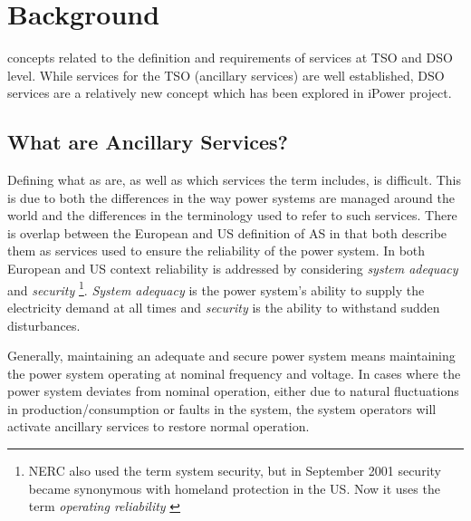 
\section{Background}\label{sec:backgroundservicesandreq} %
 concepts related to the definition and requirements of services at TSO and DSO level. While services for the TSO (ancillary services) are well established, DSO services are a relatively new concept which has been explored in iPower project.
\subsection{What are Ancillary Services?} %
\label{sub:ancillaryservicesdef}
Defining what \gls{as} are, as well as which services the term includes, is difficult. This is due to both the differences in the way power systems are managed around the world and the differences in the terminology used to refer to such services. There is overlap between the European and US definition of AS in that both describe them as services used to ensure the reliability of the power system. In both European and US context reliability is addressed by considering \emph{system adequacy} and \emph{security} \footnote{NERC also used the term system security, but in September 2001 security became synonymous with homeland protection in the US. Now it uses the term \emph{operating reliability} \cite{nerc2007definition}}. \emph{System adequacy} is the power system's ability to supply the electricity demand at all times and \emph{security} is the ability to withstand sudden disturbances.

Generally, maintaining an adequate and secure power system means maintaining the power system operating at nominal frequency and voltage. In cases where the power system deviates from nominal operation, either due to natural fluctuations in production/consumption or faults in the system, the system operators will activate ancillary services to restore normal operation. 

